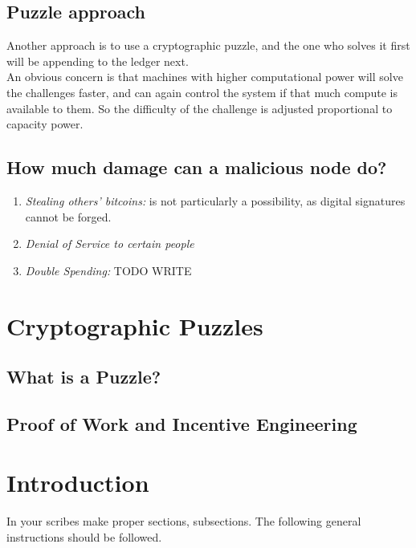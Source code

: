 \documentclass[10pt,a4paper]{article}
\begin{document}
\subsection{Puzzle approach}
Another approach is to use a cryptographic puzzle, and the one who solves it first will be appending to the ledger next.\\
An obvious concern is that machines with higher computational power will solve the challenges faster, and can again control the system if that much compute is available to them. So the difficulty of the challenge is adjusted proportional to capacity power. 

\subsection{How much damage can a malicious node do?}
\begin{enumerate}
\item \emph{Stealing others' bitcoins: } is not particularly a possibility, as digital signatures cannot be forged.

\item \emph{Denial of Service to certain people}

\item \emph{Double Spending: } TODO WRITE
\end{enumerate}


\section{Cryptographic Puzzles}

\subsection{What is a Puzzle?}
\subsection{Proof of Work and Incentive Engineering}




\section{Introduction}
In your scribes make proper sections, subsections.
The following general instructions should be followed.
\end{document}

